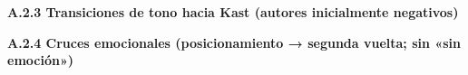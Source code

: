 \documentclass[
  letterpaper,
  numbers=noendperiod,
  fontsize=11pt,
  DIV=12,
  titlepage=false]{scrreprt}
\begin{document}
\textbf{A.2.3 Transiciones de tono hacia Kast (autores inicialmente
negativos)}

\begin{table}

\caption{\label{tbl-anexo-kast-transiciones}Transiciones de tono hacia
Kast (autores negativos iniciales).}


\end{table}%

\textbf{A.2.4 Cruces emocionales (posicionamiento → segunda vuelta; sin
«sin emoción»)}
\end{document}
